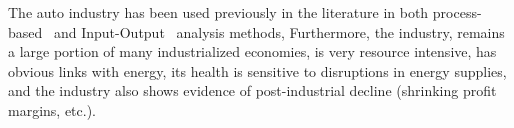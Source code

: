 The auto industry has been used previously
in the literature in both 
process-based~\cite{Berry:1973vo, Sullivan1995, Stodolsky1995, 
							Sullivan1998, McCleese2002, Sullivan2010, Hawkins2012}
and Input-Output~\cite{Bullard:1978vd, MacLean1998, MacLean2003}
analysis methods,
Furthermore, the industry,
remains a large portion of many industrialized economies, 
is very resource intensive, 
has obvious links with energy,
its health is sensitive to disruptions in energy supplies, and
the industry also shows evidence of 
post-industrial decline (shrinking profit margins, etc.).







%
%


